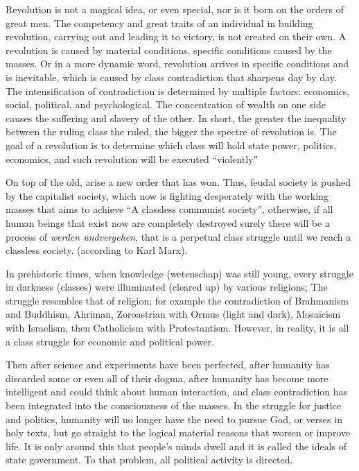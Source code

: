 Revolution is not a magical idea, or even special, nor is it born on the orders of great men. 
The competency and great traits of an individual in building revolution, carrying out and leading it to 
victory, is not created on their own. A revolution is caused by material conditions, specific conditions 
caused by the masses. Or in a more dynamic word, revolution arrives in specific conditions and is inevitable, 
which is caused by class contradiction that sharpens day by day. The intensification of contradiction is 
determined by multiple factors: economics, social, political, and psychological. The concentration of wealth on 
one side causes the suffering and slavery of the other. In short, the greater the inequality between the ruling 
class the ruled, the bigger the spectre of revolution is. The goal of a revolution is to determine which class 
will hold state power, politics, economics, and such revolution will be executed “violently”\vskip 0.2in

On top of the old, arise a new order that has won. Thus, feudal society is pushed by the capitalist 
society, which now is fighting desperately with the working masses that aims to achieve “A classless communist society”, 
otherwise, if all human beings that exist now are completely destroyed surely there will be a process of \emph{werden undvergehen}, 
that is a perpetual class struggle until we reach a classless society. (according to Karl Marx).\vskip 0.2in

In prehistoric times, when knowledge (wetenschap) was still young, every struggle in darkness (classes) were illuminated 
(cleared up) by various religions; The struggle resembles that of religion; for example the contradiction of Brahmanism 
and Buddhism, Ahriman, Zoroastrian with Ormus (light and dark), Mosaicism with Israelism, then Catholicism with Protestantism. 
However, in reality, it is all a class struggle for economic and political power.\vskip 0.2in

Then after science and experiments have been perfected, after humanity has discarded some or even all of their dogma, 
after humanity has become more intelligent and could think about human interaction, and class contradiction has 
been integrated into the consciousness of the masses. In the struggle for justice and politics, humanity will no 
longer have the need to pursue God, or verses in holy texts, but go straight to the logical material reasons that 
worsen or improve life. It is only around this that people's minds dwell and it is called the ideals of state government. 
To that problem, all political activity is directed.\vskip 0.2in

